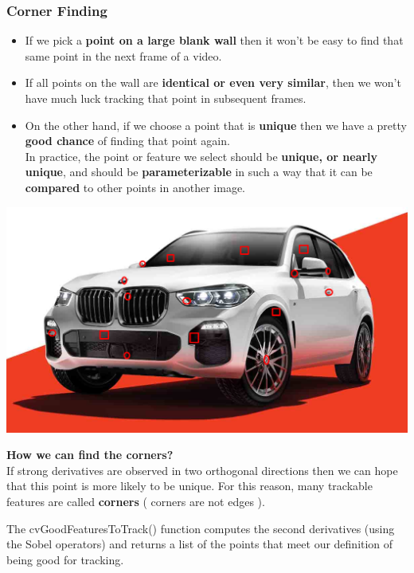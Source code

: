 \documentclass[usenames,dvipsnames]{beamer}
\begin{document}
\begin{frame}[allowframebreaks]
\frametitle{Corner Finding}
\begin{itemize}
\item If we pick a \textbf{point on a large blank wall} then it won’t be easy to find that same point in the next frame of a video.
\item If all points on the wall are \textbf{identical or even very similar}, then we won’t have much luck tracking that point in subsequent frames.
\item On the other hand, if we choose a point that is \textbf{unique} then we have a pretty \textbf{good chance} of finding that point again.\\

In practice, the point or feature we select should be \textbf{unique, or nearly unique}, and should be \textbf{parameterizable} in such a way that it can be \textbf{compared} to other points in another image.
\end{itemize}
\includegraphics[scale=.30]{Images/car.png}

\framebreak
\textbf{How we can find the corners?}\\
If strong derivatives are observed in two orthogonal directions then we can hope that this point is more likely to be unique. For this reason, many trackable features are called \textbf{corners} ( corners are not edges ).

The cvGoodFeaturesToTrack() function computes the second derivatives (using the Sobel operators) and returns a list of the
points that meet our definition of being good for tracking.
\end{frame}
\end{document}
